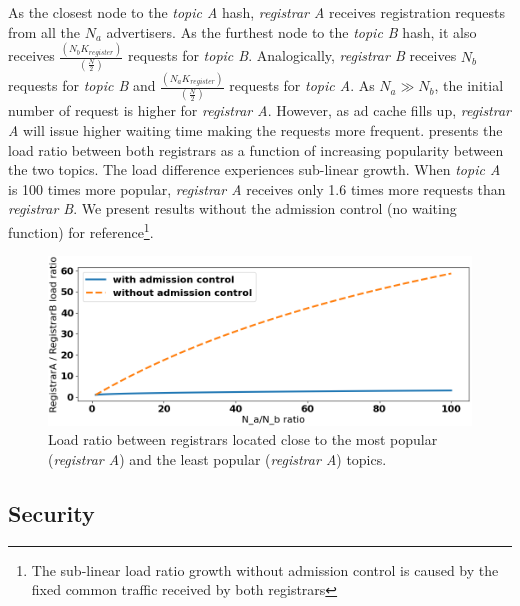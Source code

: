 As the closest node to the \emph{topic A} hash, \emph{registrar A} receives registration requests from all the $N_a$ advertisers. As the furthest node to the \emph{topic B} hash, it also receives $\frac{(N_{b}K_\textit{register})}{(\frac{N}{2})}$ requests for \emph{topic B}. Analogically, \emph{registrar B} receives $N_b$ requests for \emph{topic B} and $\frac{(N_{a}K_\textit{register})}{(\frac{N}{2})}$ requests for \emph{topic A}. As $N_a \gg N_b$, the initial number of request is higher for \emph{registrar A}. However, as ad cache fills up, \emph{registrar A} will issue higher waiting time making the requests more frequent.  presents the load ratio between both registrars as a function of increasing popularity between the two topics. The load difference experiences sub-linear growth. When \emph{topic A} is 100 times more popular, \emph{registrar A} receives only 1.6 times more requests than \emph{registrar B}. We present results without the admission control (\ie no waiting function) for reference\footnote{The sub-linear load ratio growth without admission control is caused by the fixed common traffic received by both registrars}. 

\begin{figure}[t]
    \includegraphics[width=1\linewidth]{img/fairness_registration}
    \caption{Load ratio between registrars located close to the most popular (\emph{registrar A}) and the least popular (\emph{registrar A}) topics.
    }
    \label{fig:fairness_registration}
\end{figure}







\subsection{Security}

